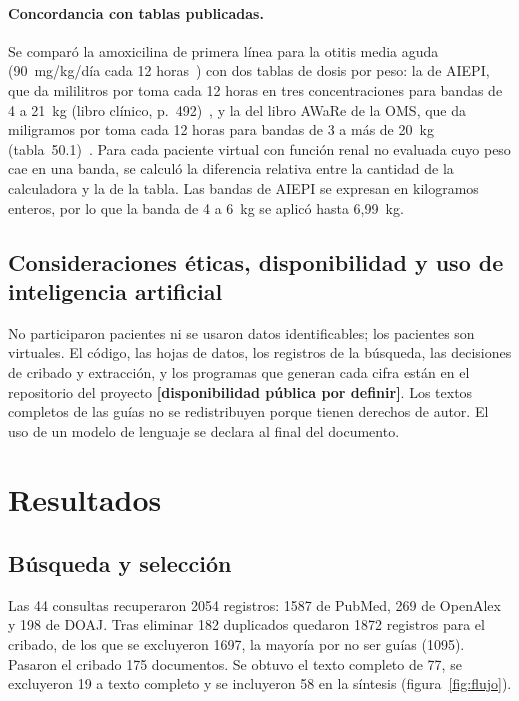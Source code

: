 \documentclass[11pt,a4paper]{article}
\newcommand{\pendiente}[1]{\textcolor{rojo}{\textbf{[#1]}}}
\begin{document}
\paragraph{Concordancia con tablas publicadas.} Se comparó la amoxicilina de primera línea para la otitis media aguda (90~mg/kg/día cada 12 horas~\citep{acorloma2024}) con dos tablas de dosis por peso: la de AIEPI, que da mililitros por toma cada 12 horas en tres concentraciones para bandas de 4 a 21~kg (libro clínico, p.~492)~\citep{aiepi2012}, y la del libro AWaRe de la OMS, que da miligramos por toma cada 12 horas para bandas de 3 a más de 20~kg (tabla~50.1)~\citep{aware2022}. Para cada paciente virtual con función renal no evaluada cuyo peso cae en una banda, se calculó la diferencia relativa entre la cantidad de la calculadora y la de la tabla. Las bandas de AIEPI se expresan en kilogramos enteros, por lo que la banda de 4 a 6~kg se aplicó hasta 6,99~kg.

\subsection{Consideraciones éticas, disponibilidad y uso de inteligencia artificial}

No participaron pacientes ni se usaron datos identificables; los pacientes son virtuales. El código, las hojas de datos, los registros de la búsqueda, las decisiones de cribado y extracción, y los programas que generan cada cifra están en el repositorio del proyecto \pendiente{disponibilidad pública por definir}. Los textos completos de las guías no se redistribuyen porque tienen derechos de autor. El uso de un modelo de lenguaje se declara al final del documento.

\section{Resultados}

\subsection{Búsqueda y selección}

Las 44 consultas recuperaron \num{2054} registros: \num{1587} de PubMed, 269 de OpenAlex y 198 de DOAJ. Tras eliminar 182 duplicados quedaron \num{1872} registros para el cribado, de los que se excluyeron \num{1697}, la mayoría por no ser guías (\num{1095}). Pasaron el cribado 175 documentos. Se obtuvo el texto completo de 77, se excluyeron 19 a texto completo y se incluyeron 58 en la síntesis (figura~\ref{fig:flujo}).
\end{document}
